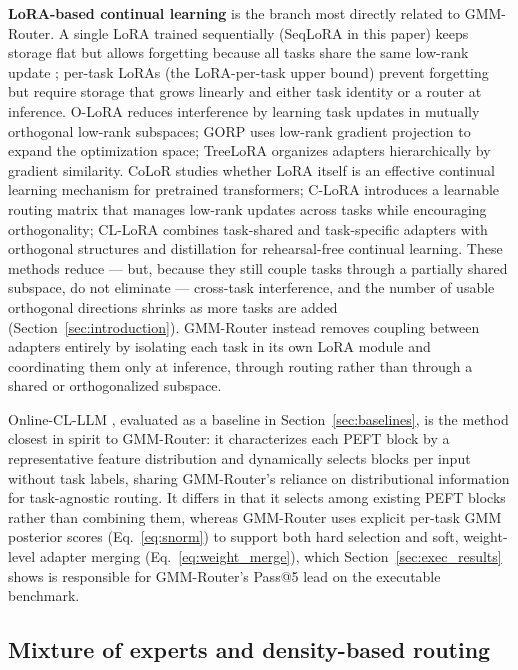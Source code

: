 \textbf{LoRA-based continual learning} is the branch most directly related to GMM-Router. A single LoRA trained sequentially (SeqLoRA in this paper) keeps storage flat but allows forgetting because all tasks share the same low-rank update \citep{hu2022lora}; per-task LoRAs (the LoRA-per-task upper bound) prevent forgetting but require storage that grows linearly and either task identity or a router at inference. O-LoRA \citep{wang2023orthogonal} reduces interference by learning task updates in mutually orthogonal low-rank subspaces; GORP \citep{wang2025continual} uses low-rank gradient projection to expand the optimization space; TreeLoRA \citep{qian2025treelora} organizes adapters hierarchically by gradient similarity. CoLoR \citep{wistuba2023continual} studies whether LoRA itself is an effective continual learning mechanism for pretrained transformers; C-LoRA \citep{zhang2025clora} introduces a learnable routing matrix that manages low-rank updates across tasks while encouraging orthogonality; CL-LoRA \citep{he2025cllora} combines task-shared and task-specific adapters with orthogonal structures and distillation for rehearsal-free continual learning. These methods reduce --- but, because they still couple tasks through a partially shared subspace, do not eliminate --- cross-task interference, and the number of usable orthogonal directions shrinks as more tasks are added (Section~\ref{sec:introduction}). GMM-Router instead removes coupling between adapters entirely by isolating each task in its own LoRA module and coordinating them only at inference, through routing rather than through a shared or orthogonalized subspace.

Online-CL-LLM \citep{cheng2025exploiting}, evaluated as a baseline in Section~\ref{sec:baselines}, is the method closest in spirit to GMM-Router: it characterizes each PEFT block by a representative feature distribution and dynamically selects blocks per input without task labels, sharing GMM-Router's reliance on distributional information for task-agnostic routing. It differs in that it selects among existing PEFT blocks rather than combining them, whereas GMM-Router uses explicit per-task GMM posterior scores (Eq.~\eqref{eq:snorm}) to support both hard selection and soft, weight-level adapter merging (Eq.~\eqref{eq:weight_merge}), which Section~\ref{sec:exec_results} shows is responsible for GMM-Router's Pass@5 lead on the executable benchmark.

\subsection{Mixture of experts and density-based routing}
\label{sec:rw_moe}

